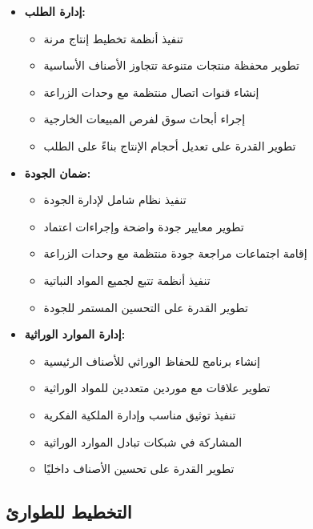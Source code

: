 \begin{itemize}
    \item \textbf{إدارة الطلب:}
    \begin{itemize}
        \item تنفيذ أنظمة تخطيط إنتاج مرنة
        \item تطوير محفظة منتجات متنوعة تتجاوز الأصناف الأساسية
        \item إنشاء قنوات اتصال منتظمة مع وحدات الزراعة
        \item إجراء أبحاث سوق لفرص المبيعات الخارجية
        \item تطوير القدرة على تعديل أحجام الإنتاج بناءً على الطلب
    \end{itemize}
    
    \item \textbf{ضمان الجودة:}
    \begin{itemize}
        \item تنفيذ نظام شامل لإدارة الجودة
        \item تطوير معايير جودة واضحة وإجراءات اعتماد
        \item إقامة اجتماعات مراجعة جودة منتظمة مع وحدات الزراعة
        \item تنفيذ أنظمة تتبع لجميع المواد النباتية
        \item تطوير القدرة على التحسين المستمر للجودة
    \end{itemize}
    
    \item \textbf{إدارة الموارد الوراثية:}
    \begin{itemize}
        \item إنشاء برنامج للحفاظ الوراثي للأصناف الرئيسية
        \item تطوير علاقات مع موردين متعددين للمواد الوراثية
        \item تنفيذ توثيق مناسب وإدارة الملكية الفكرية
        \item المشاركة في شبكات تبادل الموارد الوراثية
        \item تطوير القدرة على تحسين الأصناف داخليًا
    \end{itemize}
\end{itemize}

\subsection{التخطيط للطوارئ}

